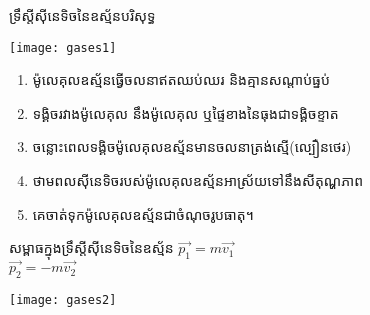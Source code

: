\documentclass[12pt,xetex,serif]{beamer}
\begin{document}
	\begin{frame}
		\titlepage
	\end{frame}
	\begin{frame}{ទ្រឹស្តីសុីនេទិចនៃឧស្ម័នបរិសុទ្ធ}
		\begin{multicols}{2}
			\texttt{[image: gases1]}
			\begin{enumerate}
				\item ម៉ូលេគុលឧស្ម័នធ្វើចលនាឥតឈប់ឈរ និងគ្មានសណ្តាប់ធ្នប់
				\item ទង្គិចរវាងម៉ូលេគុល នឹងម៉ូលេគុល ឬផ្ទៃខាងនៃធុងជាទង្គិចខ្ទាត
				\item ចន្លោះពេលទង្គិចម៉ូលេគុលឧស្ម័នមានចលនាត្រង់ស្មើ(ល្បឿនថេរ)
				\item ថាមពលសុីនេទិចរបស់ម៉ូលេគុលឧស្ម័នអាស្រ័យទៅនឹងសីតុណ្ហភាព
				\item គេចាត់ទុកម៉ូលេគុលឧស្ម័នជាចំណុចរូបធាតុ។
			\end{enumerate}
		\end{multicols}
	\end{frame}
	\begin{frame}{សម្ពាធក្នុងទ្រឹស្តីសុីនេទិចនៃឧស្ម័ន}
			\quad $\overrightarrow{p_1}=m\vec{v_1}$\\
			\quad $\overrightarrow{p_2}=-m\vec{v_2}$
		\begin{center}
			\texttt{[image: gases2]}
		\end{center}
	\end{frame}
    \begin{frame}{\bibname}
    	
    \end{frame}
\end{document}
